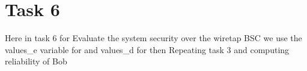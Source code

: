 \documentclass{report}
\begin{document}
\section*{Task 6}

Here in task 6 for Evaluate the system security over the wiretap BSC we use the values\_e variable for \textepsilon \space and values\_d for \textdelta \space then Repeating task 3 and computing reliability of Bob 
\end{document}
